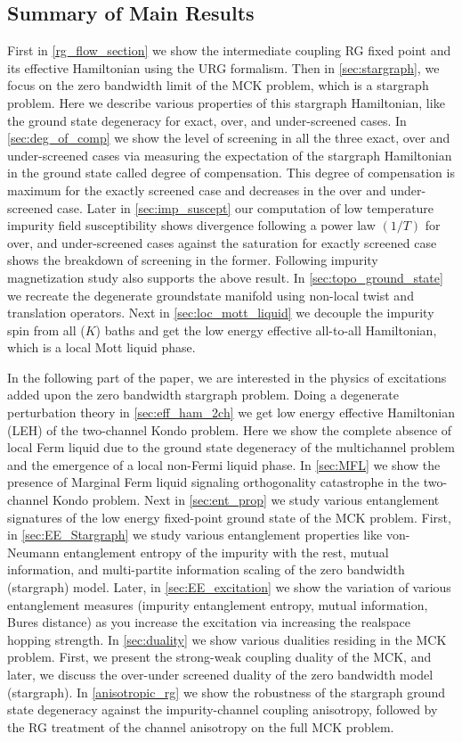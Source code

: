\documentclass[reprint,prb,superscriptaddress]{revtex4-2}
\begin{document}
\subsection*{Summary of Main Results} 
First in \ref{rg_flow_section} we show the intermediate coupling RG fixed point and its effective Hamiltonian using the URG formalism. Then in \ref{sec:stargraph}, we focus on the zero bandwidth limit of the MCK problem, which is a stargraph problem. Here we describe various properties of this stargraph Hamiltonian, like the ground state degeneracy for exact, over, and under-screened cases. In \ref{sec:deg_of_comp} we show the level of screening in all the three exact, over and under-screened cases via measuring the expectation of the stargraph Hamiltonian in the ground state called degree of compensation. This degree of compensation is maximum for the exactly screened case and decreases in the over and under-screened case. Later in \ref{sec:imp_suscept} our computation of low temperature impurity field susceptibility shows divergence following a power law $(1/T)$ for over, and under-screened cases against the saturation for exactly screened case shows the breakdown of screening in the former. Following impurity magnetization study also supports the above result. In \ref{sec:topo_ground_state} we recreate the degenerate groundstate manifold using non-local twist and translation operators. Next in \ref{sec:loc_mott_liquid} we decouple the impurity spin from all ($K$) baths and get the low energy effective all-to-all Hamiltonian, which is a local Mott liquid phase.

\par In the following part of the paper, we are interested in the physics of excitations added upon the zero bandwidth stargraph problem. Doing a degenerate perturbation theory in \ref{sec:eff_ham_2ch} we get low energy effective Hamiltonian (LEH) of the two-channel Kondo problem. Here we show the complete absence of local Ferm liquid due to the ground state degeneracy of the multichannel problem and the emergence of a local non-Fermi liquid phase. In \ref{sec:MFL} we show the presence of Marginal Ferm liquid signaling orthogonality catastrophe in the two-channel Kondo problem. Next in \ref{sec:ent_prop} we study various entanglement signatures of the low energy fixed-point ground state of the MCK problem. First, in \ref{sec:EE_Stargraph} we study various entanglement properties like von-Neumann entanglement entropy of the impurity with the rest, mutual information, and multi-partite information scaling of the zero bandwidth (stargraph) model. Later, in \ref{sec:EE_excitation} we show the variation of various entanglement measures (impurity entanglement entropy, mutual information, Bures distance) as you increase the excitation via increasing the realspace hopping strength. In \ref{sec:duality} we show various dualities residing in the MCK problem. First, we present the strong-weak coupling duality of the MCK, and later, we discuss the over-under screened duality of the zero bandwidth model (stargraph). In \ref{anisotropic_rg} we show the robustness of the stargraph ground state degeneracy against the impurity-channel coupling anisotropy, followed by the RG treatment of the channel anisotropy on the full MCK problem.
\end{document}
